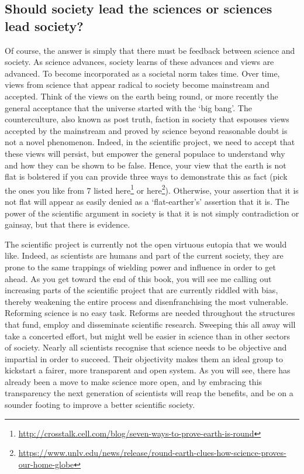 \documentclass[
]{krantz}
\renewcommand{\href}[2]{#2\footnote{\url{#1}}}
\begin{document}
\hypertarget{should-society-lead-the-sciences-or-sciences-lead-society}{%
\subsection{Should society lead the sciences or sciences lead society?}\label{should-society-lead-the-sciences-or-sciences-lead-society}}

Of course, the answer is simply that there must be feedback between science and society. As science advances, society learns of these advances and views are advanced. To become incorporated as a societal norm takes time. Over time, views from science that appear radical to society become mainstream and accepted. Think of the views on the earth being round, or more recently the general acceptance that the universe started with the `big bang'. The counterculture, also known as post truth, faction in society that espouses views accepted by the mainstream and proved by science beyond reasonable doubt is not a novel phenomenon. Indeed, in the scientific project, we need to accept that these views will persist, but empower the general populace to understand why and how they can be shown to be false. Hence, your view that the earth is not flat is bolstered if you can provide three ways to demonstrate this as fact (pick the ones you like from 7 listed \href{http://crosstalk.cell.com/blog/seven-ways-to-prove-earth-is-round}{here} or \href{https://www.unlv.edu/news/release/round-earth-clues-how-science-proves-our-home-globe}{here}). Otherwise, your assertion that it is not flat will appear as easily denied as a `flat-earther's' assertion that it is. The power of the scientific argument in society is that it is not simply contradiction or gainsay, but that there is evidence.

The scientific project is currently not the open virtuous eutopia that we would like. Indeed, as scientists are humans and part of the current society, they are prone to the same trappings of wielding power and influence in order to get ahead. As you get toward the end of this book, you will see me calling out increasing parts of the scientific project that are currently riddled with bias, thereby weakening the entire process and disenfranchising the most vulnerable. Reforming science is no easy task. Reforms are needed throughout the structures that fund, employ and disseminate scientific research. Sweeping this all away will take a concerted effort, but might well be easier in science than in other sectors of society. Nearly all scientists recognise that science needs to be objective and impartial in order to succeed. Their objectivity makes them an ideal group to kickstart a fairer, more transparent and open system. As you will see, there has already been a move to make science more open, and by embracing this transparency the next generation of scientists will reap the benefits, and be on a sounder footing to improve a better scientific society.
\end{document}
